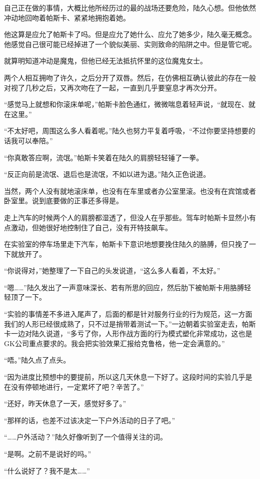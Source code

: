 自己正在做的事情，大概比他所经历过的最的战场还要危险，陆久心想。但他依然冲动地回吻着帕斯卡、紧紧地拥抱着她。

他这算是应允了帕斯卡了吗。但是应允了她什么、应允了她多少，陆久毫无概念。他感觉自己很可能已经掉进了一个貌似美丽、实则致命的陷阱之中。但是管它呢。

就算明知道冲动是魔鬼，但他已经无法抵抗怀里的这位魔鬼女士。

两个人相互拥吻了许久，之后分开了双唇。然后，在仿佛相互确认彼此的存在一般对视了几秒之后，又再次吻在了一起，一直到几乎要窒息才再次分开。

“感觉马上就想和你滚床单呢，”帕斯卡脸色通红，微微喘息着轻声说，“就现在、就在这里。”

“不太好吧，周围这么多人看着呢。”陆久也努力平复着呼吸，“不过你要坚持想要的话我可以奉陪。”

“你真敢答应啊，流氓。”帕斯卡笑着在陆久的肩膀轻轻锤了一拳。

“反正向前是流氓、退后也是流氓，不如以进为退。”陆久正色说道。

当然，两个人没有就地滚床单，也没有在车里或者办公室里滚。也没有在宾馆或者卧室里。说到底要做的正事还多得是。

走上汽车的时候两个人的肩膀都湿透了，但没人在乎那些。驾车时帕斯卡显然小有点激动，但她很好地控制住了自己，没有开特技飙车。

在实验室的停车场里走下汽车，帕斯卡下意识地想要挽住陆久的胳膊，但只挽了一下就放开了。

“你说得对，”她整理了一下自己的头发说道，“这么多人看着，不太好。”

“嗯……”陆久发出了一声意味深长、若有所思的回应，然后肋下被帕斯卡用胳膊轻轻顶了一下。

“实验的事情差不多进入尾声了，后面的都是针对服务行业的行为规范，这一方面我们的人形已经很成熟了，只不过是捎带着测试一下。”一边朝着实验室走去，帕斯卡一边对陆久说道，“多亏了你，人形作战方面的行为模式塑化非常成功，这也是GK公司重点要求的。我会把实验效果汇报给克鲁格，他一定会满意的。”

“唔。”陆久点了点头。

“因为进度比预想中的要提前，所以这几天休息一下好了。这段时间的实验几乎是在没有停顿地进行，一定累坏了吧？辛苦了。”

“还好，昨天休息了一天，感觉好多了。”

“那样的话，也差不过该决定一下户外活动的日子了吧。”

“……户外活动？”陆久好像听到了一个值得关注的词。

“是啊。之前不是说好的吗。”

“什么说好了？我不是太……”

